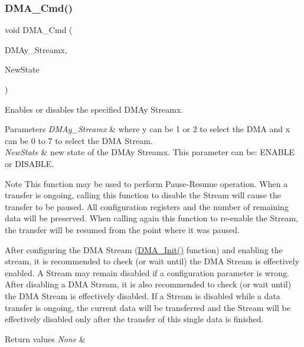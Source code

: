 \subsubsection{\texorpdfstring{D\+M\+A\+\_\+\+Cmd()}{DMA\_Cmd()}}
{\footnotesize\ttfamily void D\+M\+A\+\_\+\+Cmd (\begin{DoxyParamCaption}\item[{\hyperlink{struct_d_m_a___stream___type_def}{D\+M\+A\+\_\+\+Stream\+\_\+\+Type\+Def} $\ast$}]{D\+M\+Ay\+\_\+\+Streamx,  }\item[{Functional\+State}]{New\+State }\end{DoxyParamCaption})}



Enables or disables the specified D\+M\+Ay Streamx. 


\begin{DoxyParams}{Parameters}
{\em D\+M\+Ay\+\_\+\+Streamx} & where y can be 1 or 2 to select the D\+MA and x can be 0 to 7 to select the D\+MA Stream. \\
\hline
{\em New\+State} & new state of the D\+M\+Ay Streamx. This parameter can be\+: E\+N\+A\+B\+LE or D\+I\+S\+A\+B\+LE.\\
\hline
\end{DoxyParams}
\begin{DoxyNote}{Note}
This function may be used to perform Pause-\/\+Resume operation. When a transfer is ongoing, calling this function to disable the Stream will cause the transfer to be paused. All configuration registers and the number of remaining data will be preserved. When calling again this function to re-\/enable the Stream, the transfer will be resumed from the point where it was paused.

After configuring the D\+MA Stream (\hyperlink{group___d_m_a___group1_gaced8a4149acfb0a50b50e63273a87148}{D\+M\+A\+\_\+\+Init()} function) and enabling the stream, it is recommended to check (or wait until) the D\+MA Stream is effectively enabled. A Stream may remain disabled if a configuration parameter is wrong. After disabling a D\+MA Stream, it is also recommended to check (or wait until) the D\+MA Stream is effectively disabled. If a Stream is disabled while a data transfer is ongoing, the current data will be transferred and the Stream will be effectively disabled only after the transfer of this single data is finished.
\end{DoxyNote}

\begin{DoxyRetVals}{Return values}
{\em None} & \\
\hline
\end{DoxyRetVals}


